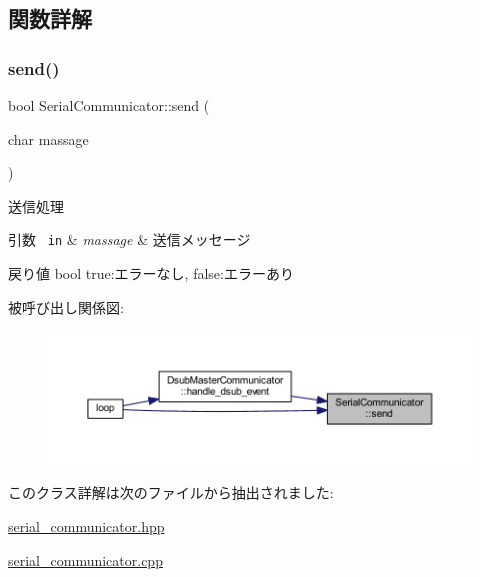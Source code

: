 \subsection{関数詳解}
\mbox{\label{class_serial_communicator_add5f2442d225ecc542f4b8c58a970281}} 
\subsubsection{\texorpdfstring{send()}{send()}}
{\footnotesize\ttfamily bool Serial\+Communicator\+::send (\begin{DoxyParamCaption}\item[{char}]{massage }\end{DoxyParamCaption})}



送信処理 


\begin{DoxyParams}[1]{引数}
\mbox{\texttt{ in}}  & {\em massage} & 送信メッセージ \\
\hline
\end{DoxyParams}
\begin{DoxyReturn}{戻り値}
bool true\+:エラーなし, false\+:エラーあり 
\end{DoxyReturn}
被呼び出し関係図\+:\nopagebreak
\begin{figure}[H]
\begin{center}
\leavevmode
\includegraphics[width=350pt]{class_serial_communicator_add5f2442d225ecc542f4b8c58a970281_icgraph}
\end{center}
\end{figure}


このクラス詳解は次のファイルから抽出されました\+:\begin{DoxyCompactItemize}
\item 
\mbox{\hyperlink{serial__communicator_8hpp}{serial\+\_\+communicator.\+hpp}}\item 
\mbox{\hyperlink{serial__communicator_8cpp}{serial\+\_\+communicator.\+cpp}}\end{DoxyCompactItemize}
